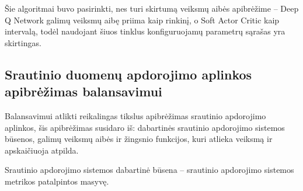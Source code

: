 \documentclass{VUMIFPSbakalaurinis}
\begin{document}
Šie algoritmai buvo pasirinkti, nes turi skirtumą veiksmų aibės apibrėžime – Deep Q Network galimų veiksmų aibę priima kaip rinkinį, o Soft Actor Critic kaip intervalą, todėl naudojant šiuos tinklus konfiguruojamų parametrų sąrašas yra skirtingas. 

\subsection{Srautinio duomenų apdorojimo aplinkos apibrėžimas balansavimui}

Balansavimui atlikti reikalingas tikslus apibrėžimas srautinio apdorojimo aplinkos, šis apibrėžimas susidaro iš: dabartinės srautinio apdorojimo sistemos būsenos, galimų veiksmų aibės ir žingsnio funkcijos, kuri atlieka veiksmą ir apskaičiuoja atpilda.

Srautinio apdorojimo sistemos dabartinė būsena – srautinio apdorojimo sistemos metrikos patalpintos masyvę.
\end{document}
